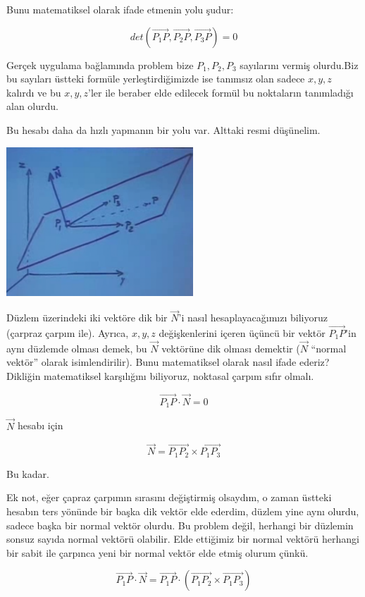 \documentclass[12pt,fleqn]{article}\usepackage{../../common}
\begin{document}
Bunu matematiksel olarak ifade etmenin yolu şudur:

$$ det(\vec{P_1P},\vec{P_2P},\vec{P_3P}) = 0 $$

Gerçek uygulama bağlamında problem bize $P_1,P_2,P_3$ sayılarını vermiş
olurdu.Biz bu sayıları üstteki formüle yerleştirdiğimizde ise tanımsız olan
sadece $x,y,z$ kalırdı ve bu $x,y,z$'ler ile beraber elde edilecek formül bu
noktaların tanımladığı alan olurdu.

Bu hesabı daha da hızlı yapmanın bir yolu var. Alttaki resmi
düşünelim.

\begin{center}
\includegraphics[width=7cm]{3_3.png}
\end{center}

Düzlem üzerindeki iki vektöre dik bir $\vec{N}$'i nasıl hesaplayacağımızı
biliyoruz (çarpraz çarpım ile).  Ayrıca, $x,y,z$ değişkenlerini içeren üçüncü
bir vektör $\vec{P_1P}$'in aynı düzlemde olması demek, bu $\vec{N}$ vektörüne
dik olması demektir ($\vec{N}$ ``normal vektör'' olarak isimlendirilir). Bunu
matematiksel olarak nasıl ifade ederiz? Dikliğin matematiksel karşılığını
biliyoruz, noktasal çarpım sıfır olmalı.

$$ \vec{P_1P} \cdot \vec{N} = 0 $$

$\vec{N}$ hesabı için

$$ \vec{N} = \vec{P_1P_2} \times \vec{P_1P_3}$$

Bu kadar.

Ek not, eğer çapraz çarpımın sırasını değiştirmiş olsaydım, o zaman üstteki
hesabın ters yönünde bir başka dik vektör elde ederdim, düzlem yine aynı olurdu,
sadece başka bir normal vektör olurdu. Bu problem değil, herhangi bir düzlemin
sonsuz sayıda normal vektörü olabilir. Elde ettiğimiz bir normal vektörü
herhangi bir sabit ile çarpınca yeni bir normal vektör elde etmiş olurum çünkü.

$$ \vec{P_1P} \cdot \vec{N} =
\vec{P_1P} \cdot (\vec{P_1P_2} \times \vec{P_1P_3})
$$
\end{document}
